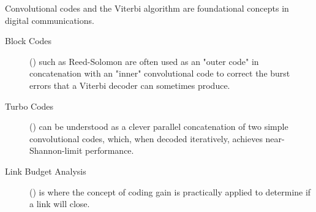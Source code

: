 \begin{importantbox}[title={Further Reading}]
    Convolutional codes and the Viterbi algorithm are foundational concepts in digital communications.
    \begin{description}
        \item[Block Codes] () such as Reed-Solomon are often used as an "outer code" in concatenation with an "inner" convolutional code to correct the burst errors that a Viterbi decoder can sometimes produce.
        \item[Turbo Codes] () can be understood as a clever parallel concatenation of two simple convolutional codes, which, when decoded iteratively, achieves near-Shannon-limit performance.
        \item[Link Budget Analysis] () is where the concept of coding gain is practically applied to determine if a link will close.
    \end{description}
\end{importantbox}